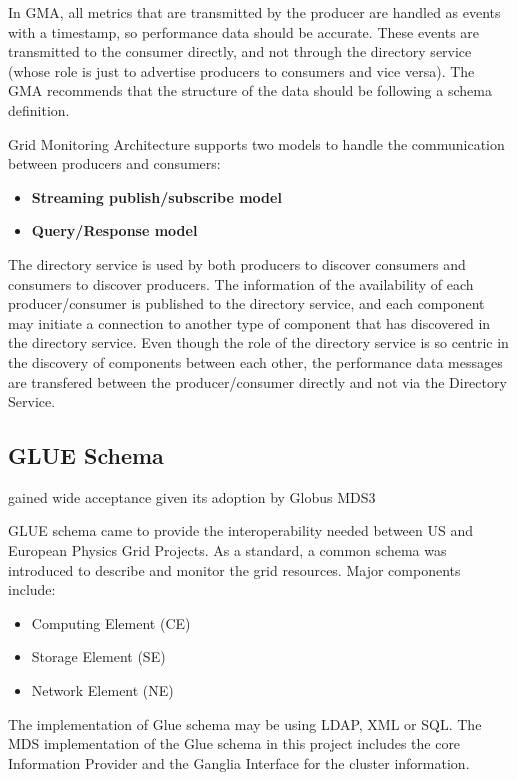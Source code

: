 In GMA, all metrics that are transmitted by the producer are handled as events with a timestamp, so performance data should be accurate. These events are transmitted to the consumer directly, and not through the directory service (whose role is just to advertise producers to consumers and vice versa). The GMA recommends that the structure of the data should be following a schema definition. 

Grid Monitoring Architecture supports two models to handle the communication between producers and consumers:

\begin{itemize}
\item {\bf Streaming publish/subscribe model}
\item {\bf Query/Response model}
\end{itemize}

The directory service is used by both producers to discover consumers and consumers to discover producers. The information of the availability of each producer/consumer is published to the directory service, and each component may initiate a connection to another type of component that has discovered in the directory service. Even though the role of the directory service is so centric in the discovery of components between each other, the performance data messages are transfered between the producer/consumer directly and not via the Directory Service.



\subsection{GLUE Schema}
gained wide acceptance given its adoption by Globus MDS3


GLUE schema came to provide the interoperability needed between US and European Physics Grid Projects. As a standard, a common schema was introduced to describe and monitor the grid resources. Major components include:
\begin{itemize}
\item Computing Element (CE)
\item Storage Element (SE)
\item Network Element (NE)
\end{itemize}

The implementation of Glue schema may be using LDAP, XML or SQL. The MDS implementation of the Glue schema in this project includes the core Information Provider and the Ganglia Interface for the cluster information.


